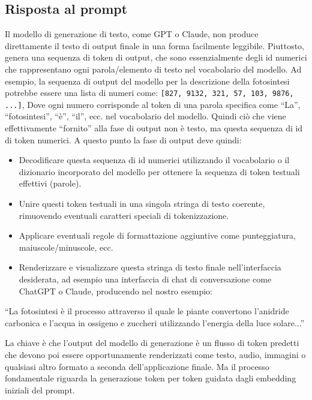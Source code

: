     \subsection{Risposta al prompt}
        Il modello di generazione di testo, come GPT o Claude, non produce direttamente il testo di output finale in una forma facilmente leggibile. Piuttosto, genera una sequenza di token di output, che sono essenzialmente degli id numerici che rappresentano ogni parola/elemento di testo nel vocabolario del modello. Ad esempio, la sequenza di output del modello per la descrizione della fotosintesi potrebbe essere una lista di numeri come: \texttt{[827, 9132, 321, 57, 103, 9876, ...]}, Dove ogni numero corrisponde al token di una parola specifica come ``La'', ``fotosintesi'', ``è'', ``il'', ecc. nel vocabolario del modello. Quindi ciò che viene effettivamente ``fornito'' alla fase di output non è testo, ma questa sequenza di id di token numerici. A questo punto la fase di output deve quindi:
        \begin{itemize}
            \item Decodificare questa sequenza di id numerici utilizzando il vocabolario o il dizionario incorporato del modello per ottenere la sequenza di token testuali effettivi (parole).
        
            \item Unire questi token testuali in una singola stringa di testo coerente, rimuovendo eventuali caratteri speciali di tokenizzazione.
        
            \item Applicare eventuali regole di formattazione aggiuntive come punteggiatura, maiuscole/minuscole, ecc.
        
            \item Renderizzare e visualizzare questa stringa di testo finale nell'interfaccia desiderata, ad esempio una interfaccia di chat di conversazione come ChatGPT o Claude, producendo nel nostro esempio:
        \end{itemize}

        ``La fotosintesi è il processo attraverso il quale le piante convertono l'anidride carbonica e l'acqua in ossigeno e zuccheri utilizzando l'energia della luce solare...''
        
        La chiave è che l'output del modello di generazione è un flusso di token predetti che devono poi essere opportunamente renderizzati come testo, audio, immagini o qualsiasi altro formato a seconda dell'applicazione finale. Ma il processo fondamentale riguarda la generazione token per token guidata dagli embedding iniziali del prompt.
        
